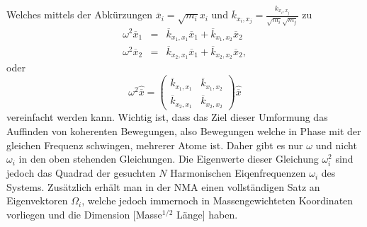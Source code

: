 \documentclass[a4paper,12pt]{article}
\begin{document}
Welches mittels der Abkürzungen $\overline{x}_i=\sqrt{m_i}x_i$ und $\overline{k}_{x_i,x_j}=\frac{{k}_{x_i,x_j}}{\sqrt{m_i}\sqrt{m_j}}$
zu
\begin{eqnarray}
 \omega^2 \overline{x}_1 &=& \overline{k}_{x_1,x_1} \overline{x}_1 +\overline{k}_{x_1,x_2} \overline{x}_2\\
 \omega^2 \overline{x}_2 &=& \overline{k}_{x_2,x_1} \overline{x}_1 +\overline{k}_{x_2,x_2} \overline{x}_2,
\end{eqnarray}
oder
\begin{equation}
 \omega^2 
 \hat{\overline{x}} = 
 \begin{pmatrix}
  \overline{k}_{x_1,x_1} &\overline{k}_{x_1,x_2}\\
  \overline{k}_{x_2,x_1} &\overline{k}_{x_2,x_2}
 \end{pmatrix}
 \hat{\overline{x}}
\end{equation}
vereinfacht werden kann. Wichtig ist, dass das Ziel dieser Umformung das Auffinden von koherenten Bewegungen, also Bewegungen welche in
Phase mit der gleichen Frequenz schwingen, mehrerer Atome ist. Daher gibt es nur $\omega$ und nicht $\omega_i$ in den oben stehenden
Gleichungen. Die Eigenwerte dieser Gleichung $\omega_i^2$ sind jedoch das Quadrad der gesuchten $N$ Harmonischen 
Eiqenfrequenzen $\omega_i$ des Systems. Zusätzlich erhält man in der NMA einen vollständigen Satz an Eigenvektoren $\Omega_i$, 
welche jedoch immernoch in Massengewichteten Koordinaten vorliegen und die Dimension [Masse$^{1/2}$ Länge] haben.
\end{document}
